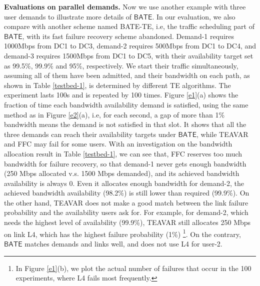\documentclass[sigconf]{acmart}
\begin{document}
\textbf{Evaluations on parallel demands.}
Now we use another example with three user demands to illustrate more details of $\mathsf{BATE}$. 
In our evaluation, we also compare with another scheme named BATE-TE, i.e, the traffic scheduling part of $\mathsf{BATE}$, with its fast failure recovery scheme abandoned. 
Demand-1 requires 1000Mbps from DC1 to DC3, demand-2 requires  500Mbps from DC1 to DC4, 
and demand-3 requires 1500Mbps from DC1 to DC5, 
with their availability target set as 99.5\%, 99.9\% and 95\%, respectively. 
We start their traffic simultaneously, assuming all of them have been admitted, 
and their bandwidth on each path, as shown in Table \ref{testbed-1}, 
is determined by different TE algorithms. 
The experiment lasts 100s and is repeated by 100 times.
Figure \ref{e1}(a) shows the fraction of time each bandwidth availability demand is satisfied, 
using the same method as in Figure \ref{e2}(a), i.e, for each second, 
a gap of more than 1\% bandwidth means the demand is not satisfied in that slot. 
It shows that all the three demands can reach their availability targets under $\mathsf{BATE}$,
while TEAVAR and FFC may fail for some users. 
With an investigation on the bandwidth allocation result in Table \ref{testbed-1}, 
we can see that, FFC reserves too much bandwidth for failure recovery, 
so that demand-1 never gets enough bandwidth (250 Mbps allocated v.s. 1500 Mbps demanded), 
and its achieved bandwidth availability is always 0. 
Even it allocates enough bandwidth for demand-2, the achieved bandwidth availability (98.2\%)  
is still lower than required (99.9\%). 
On the other hand, TEAVAR does not make a good match between the link failure probability and the availability users ask for. 
For example, for demand-2, which needs the highest level of availability (99.9\%), 
TEAVAR still allocates 250 Mbps on link L4, which has the highest failure probability (1\%) 
\footnote{In Figure \ref{e1}(b), we plot the actual number of failures that occur in the 100 experiments, 
where L4 fails most frequently.}. 
On the contrary, $\mathsf{BATE}$ matches demands and links well, and does not use L4 for user-2.
\end{document}
